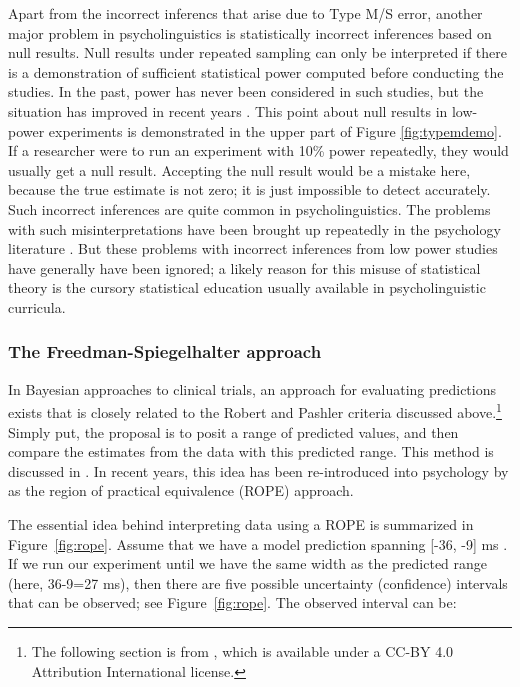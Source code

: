 \documentclass{cambridge7A}\usepackage[]{graphicx}\usepackage[]{color}
\begin{document}
Apart from the incorrect inferencs that  arise due to Type M/S error,  
another major problem in psycholinguistics is statistically incorrect inferences based on null results.  Null results under repeated sampling can only be interpreted if there is a demonstration of sufficient statistical power \citep{hoenigheisey} computed before conducting the studies. In the past,  power has never been considered in such studies, but the situation has improved in recent years \citep[e.g.,][]{stack2018failure}.  This point about null results in low-power experiments is demonstrated in the upper part of Figure \ref{fig:typemdemo}. If a researcher were to run an experiment with 10\% power repeatedly, they would usually get a null result. Accepting the null result would be a mistake here, because the true estimate is not zero; it is just impossible to detect accurately. Such incorrect inferences are quite common in psycholinguistics. The problems with such misinterpretations  have been brought up repeatedly in the psychology literature 
\citep[e.g.,][]{cohen1962statistical}. But these problems with incorrect inferences from low power studies have generally have been ignored; a likely reason for this misuse of statistical theory is the cursory statistical education usually available in psycholinguistic curricula.

\subsubsection{The Freedman-Spiegelhalter approach}

 
In Bayesian approaches to clinical trials, an approach for evaluating predictions exists that is closely related to the Robert and Pashler criteria discussed above.\footnote{The following section is from \cite{VasishthGelman2019}, which is available under a CC-BY 4.0 Attribution International license.}
Simply put, the proposal is to posit a range of predicted values, and then compare the estimates from the data with this predicted range.   This method is discussed in \citep{Freedman1984,spiegelhalter1994bayesian}. In recent years, this idea has been re-introduced into psychology by \cite{kruschke2014doing} as the region of practical equivalence (ROPE) approach.  

The essential idea behind interpreting data using a ROPE is summarized in Figure~\ref{fig:rope}. Assume that we have a model prediction spanning [-36, -9] ms \citep{JaegerMertzenVanDykeVasishth2019}. If we run our experiment until we have the same width as the predicted range (here, 36-9=27 ms), then there are five possible uncertainty (confidence) intervals that can be observed; see  Figure~\ref{fig:rope}. The observed interval can be: 
\end{document}
